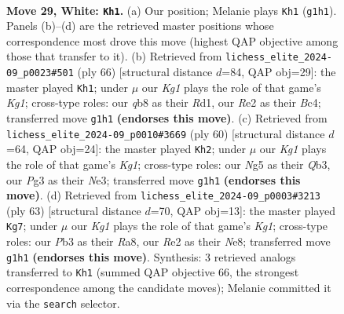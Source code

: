 \documentclass[11pt]{article}
\begin{document}
\begin{figure}[p]
\label{fig:thought-m54}
\end{figure}

\clearpage

\begin{figure}[p]\centering
\begin{subfigure}{0.46\textwidth}\centering
\resizebox{\linewidth}{!}{%
\newchessgame
\chessboard[
  setfen={1qb5/r4pkp/1p3np1/6N1/Pp6/1P4P1/3NRPBP/R5K1 w - - 8 29},
  showmover=false,
  pgfstyle=straightmove, color=movearrow, markmove={g1-h1}
]}
\caption{}
\end{subfigure}\hfill
\begin{subfigure}{0.46\textwidth}\centering
\resizebox{\linewidth}{!}{%
\newchessgame
\chessboard[
  setfen={4q3/1p4pk/1bnP3p/p4p2/P1B1p3/1P3P2/6PP/3RR1K1 w - - 1 34},
  showmover=false,
  pgfstyle=straightmove, color=movearrow, markmove={g1-h1}
]}
\caption{}
\end{subfigure}
\\[4pt]
\begin{subfigure}{0.46\textwidth}\centering
\resizebox{\linewidth}{!}{%
\newchessgame
\chessboard[
  setfen={r4bk1/5ppp/2q1p3/3p4/3P4/PQn1N1BP/5PP1/R5K1 w - - 0 31},
  showmover=false,
  pgfstyle=straightmove, color=movearrow, markmove={g1-h2}
]}
\caption{}
\end{subfigure}\hfill
\begin{subfigure}{0.46\textwidth}\centering
\resizebox{\linewidth}{!}{%
\newchessgame
\chessboard[
  setfen={r3n1k1/3n1p1p/6p1/r3p3/3PP3/pBQ3PP/R4PK1/8 b - - 3 32},
  showmover=false,
  pgfstyle=straightmove, color=movearrow, markmove={g8-g7}
]}
\caption{}
\end{subfigure}
\caption{\textbf{Move 29, White: \texttt{Kh1}.} (a) Our position; Melanie plays \texttt{Kh1} (\texttt{g1h1}). Panels (b)--(d) are the retrieved master positions whose correspondence most drove this move (highest QAP objective among those that transfer to it). (b) Retrieved from \texttt{lichess\_elite\_2024-09\_p0023\#501} (ply 66) [structural distance $d$=84, QAP obj=29]: the master played \texttt{Kh1}; under $\mu$ our \emph{Kg1} plays the role of that game's \emph{Kg1}; cross-type roles: our \emph{q}b8 as their \emph{R}d1, our \emph{R}e2 as their \emph{B}c4; transferred move \texttt{g1h1} \textbf{(endorses this move)}. (c) Retrieved from \texttt{lichess\_elite\_2024-09\_p0010\#3669} (ply 60) [structural distance $d$=64, QAP obj=24]: the master played \texttt{Kh2}; under $\mu$ our \emph{Kg1} plays the role of that game's \emph{Kg1}; cross-type roles: our \emph{N}g5 as their \emph{Q}b3, our \emph{P}g3 as their \emph{N}e3; transferred move \texttt{g1h1} \textbf{(endorses this move)}. (d) Retrieved from \texttt{lichess\_elite\_2024-09\_p0003\#3213} (ply 63) [structural distance $d$=70, QAP obj=13]: the master played \texttt{Kg7}; under $\mu$ our \emph{Kg1} plays the role of that game's \emph{Kg1}; cross-type roles: our \emph{P}b3 as their \emph{R}a8, our \emph{R}e2 as their \emph{N}e8; transferred move \texttt{g1h1} \textbf{(endorses this move)}. Synthesis: 3 retrieved analogs transferred to \texttt{Kh1} (summed QAP objective 66, the strongest correspondence among the candidate moves); Melanie committed it via the \texttt{search} selector.}

\end{figure}
\end{document}
